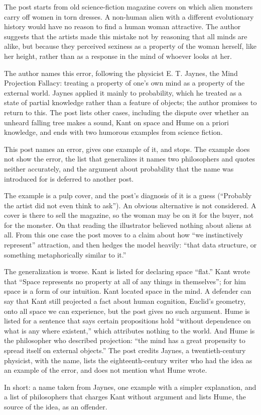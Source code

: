 \begin{afterword}
\summaryhead

The post starts from old science-fiction magazine covers on which alien monsters carry off women in torn dresses. A non-human alien with a different evolutionary history would have no reason to find a human woman attractive. The author suggests that the artists made this mistake not by reasoning that all minds are alike, but because they perceived sexiness as a property of the woman herself, like her height, rather than as a response in the mind of whoever looks at her.

The author names this error, following the physicist E. T. Jaynes, the Mind Projection Fallacy: treating a property of one's own mind as a property of the external world. Jaynes applied it mainly to probability, which he treated as a state of partial knowledge rather than a feature of objects; the author promises to return to this. The post lists other cases, including the dispute over whether an unheard falling tree makes a sound, Kant on space and Hume on a priori knowledge, and ends with two humorous examples from science fiction.

\responsehead

This post names an error, gives one example of it, and stops. The example does not show the error, the list that generalizes it names two philosophers and quotes neither accurately, and the argument about probability that the name was introduced for is deferred to another post.

The example is a pulp cover, and the post's diagnosis of it is a guess (``Probably the artist did not even think to ask''). An obvious alternative is not considered. A cover is there to sell the magazine, so the woman may be on it for the buyer, not for the monster. On that reading the illustrator believed nothing about aliens at all. From this one case the post moves to a claim about how ``we instinctively represent'' attraction, and then hedges the model heavily: ``that data structure, or something metaphorically similar to it.''

The generalization is worse. Kant is listed for declaring space ``flat.'' Kant wrote that ``Space represents no property at all of any things in themselves''; for him space is a form of our intuition. Kant located space in the mind. A defender can say that Kant still projected a fact about human cognition, Euclid's geometry, onto all space we can experience, but the post gives no such argument. Hume is listed for a sentence that says certain propositions hold ``without dependence on what is any where existent,'' which attributes nothing to the world. And Hume is the philosopher who described projection: ``the mind has a great propensity to spread itself on external objects.'' The post credits Jaynes, a twentieth-century physicist, with the name, lists the eighteenth-century writer who had the idea as an example of the error, and does not mention what Hume wrote.

In short: a name taken from Jaynes, one example with a simpler explanation, and a list of philosophers that charges Kant without argument and lists Hume, the source of the idea, as an offender.
\end{afterword}
